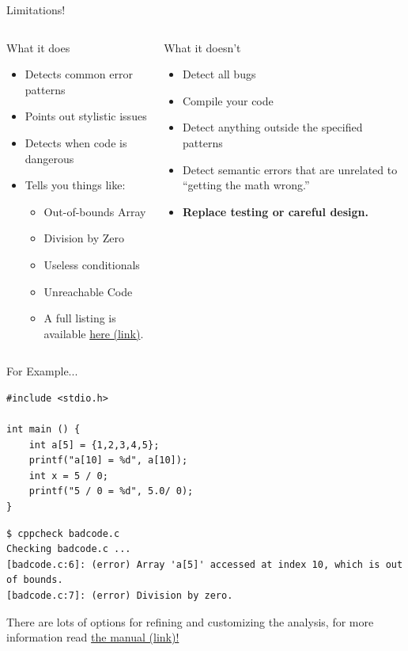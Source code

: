 \documentclass[11pt]{beamer}
\begin{document}
\begin{frame}{Limitations!}
\begin{columns}
\begin{column}{0.5\textwidth}
\center
What it does
\flushleft
\begin{itemize}
\item Detects common error patterns
\item Points out stylistic issues
\item Detects when code is dangerous
\item Tells you things like:
\begin{itemize}
\item Out-of-bounds Array
\item Division by Zero
\item Useless conditionals
\item Unreachable Code
\item A full listing is available \href{https://sourceforge.net/p/cppcheck/wiki/ListOfChecks/}{here (link)}.
\end{itemize}
\end{itemize}
\end{column}
\begin{column}{0.5\textwidth}
\center
What it doesn't
\flushleft
\begin{itemize}
\item Detect all bugs
\item Compile your code
\item Detect anything outside the specified patterns
\item Detect semantic errors that are unrelated to ``getting the math wrong.''
\item \textbf{Replace testing or careful design.}
\end{itemize}
\vspace{3em}
\end{column}
\end{columns}
\end{frame}

\begin{frame}[fragile=singleslide]{For Example...}
\begin{lstlisting}[style=C]
#include <stdio.h>

int main () {
	int a[5] = {1,2,3,4,5};
	printf("a[10] = %d", a[10]);
	int x = 5 / 0;
	printf("5 / 0 = %d", 5.0/ 0);
}
\end{lstlisting}
\begin{lstlisting}[style=terminal]
$ cppcheck badcode.c
Checking badcode.c ...
[badcode.c:6]: (error) Array 'a[5]' accessed at index 10, which is out of bounds.
[badcode.c:7]: (error) Division by zero.
\end{lstlisting}
There are lots of options for refining and customizing the analysis, for more information read \href{https://cppcheck.sourceforge.net/manual.html}{the manual (link)!}
\end{frame}
\end{document}
